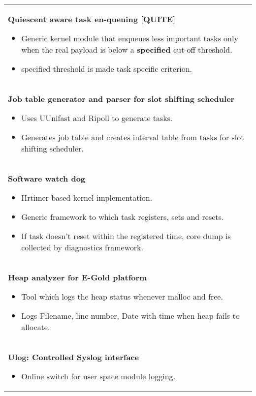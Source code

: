 \documentclass[letterpaper]{twentysecondcv} %
\begin{document}
\begin{tabular}{ |p{20cm}| } 

 \hline
 \rowcolor{sidecolor} 
 \multicolumn{1}{c}{\textbf{\Large Tools Created}} \\[2ex]
 \hline

 \vspace{1mm}
 {\large \textbf{Quiescent aware task en-queuing [QUITE]} }
 \vspace{2mm}
 \begin{itemize}
 \item Generic kernel module that enqueues less important tasks only when the real payload is below a \textbf{specified} cut-off threshold.
 \item specified threshold is made task specific criterion.
 \end{itemize} \\        
 \hline

\vspace{1mm}
 {\large \textbf{Job table generator and parser for slot shifting scheduler}}
 \vspace{2mm}
 \begin{itemize}
 \item Uses UUnifast and Ripoll to generate tasks.
 \item Generates job table and creates interval table from tasks for slot shifting scheduler. 
 \end{itemize} \\    
 \hline

\vspace{1mm} 
 {\large \textbf{Software watch dog}}
 \vspace{2mm}
 \begin{itemize}
 \item Hrtimer based kernel implementation.
 \item Generic framework to which task registers, sets and resets.
 \item If task doesn't reset within the registered time, core dump is collected by diagnostics framework.
 \end{itemize} \\
 \hline 
 
 \vspace{1mm}
 { \large \textbf{Heap analyzer for E-Gold platform}} \vspace{2mm}
 \begin{itemize}
	\item  Tool which logs the heap status whenever malloc and free.
	\item Logs Filename, line number, Date with time when heap fails to allocate.
 \end{itemize} \\
 \hline
 \vspace{1mm}
 { \large \textbf{Ulog: Controlled Syslog interface}}
 \vspace{2mm} 
 \begin{itemize}
 \item Online switch for user space module logging.
 \end{itemize} \\
 \hline
 

\end{tabular}
\end{document}
